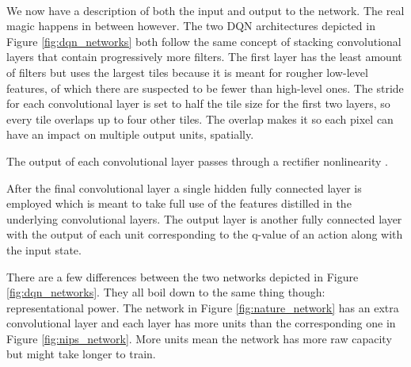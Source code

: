 \paragraph{}
We now have a description of both the input and output to the network.
The real magic happens in between however.
The two DQN architectures depicted in Figure \ref{fig:dqn_networks}
both follow the same concept
of stacking convolutional layers that
contain progressively more filters.
The first layer has the least amount of filters but uses the largest tiles
because it is meant for rougher low-level features,
of which there are suspected to be fewer than high-level ones.
The stride for each convolutional layer is set
to half the tile size for the first two layers,
so every tile overlaps up to four other tiles.
The overlap makes it so each pixel can have an impact
on multiple output units, spatially.

The output of each convolutional layer passes through a rectifier
nonlinearity \parencite{Nair2010}.

After the final convolutional layer
a single hidden fully connected layer is employed
which is meant to take full use of the features distilled
in the underlying convolutional layers.
The output layer is another fully connected layer
with the output of each unit corresponding to the q-value of an action
along with the input state.

There are a few differences between the two networks
depicted in Figure \ref{fig:dqn_networks}.
They all boil down to the same thing though:
representational power.
The network in Figure \ref{fig:nature_network}
has an extra convolutional layer
and each layer has more units than the corresponding one
in Figure \ref{fig:nips_network}.
More units mean the network has more raw capacity
but might take longer to train.

